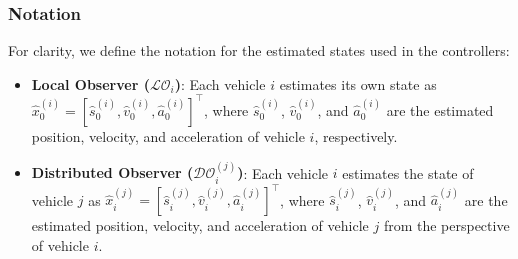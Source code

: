 \documentclass[letterpaper, 10pt, conference]{ieeeconf}  %
\def\LO{\mathcal{LO}} %
\def\DO{\mathcal{DO}} %
\begin{document}
\subsubsection{Notation}
For clarity, we define the notation for the estimated states used in the controllers:
\begin{itemize}
    \item \textbf{Local Observer ($\LO_i$)}: Each vehicle $i$ estimates its own state as $\hat{x}_0^{(i)} = [\hat{s}_0^{(i)}, \hat{v}_0^{(i)}, \hat{a}_0^{(i)}]^\top$, where $\hat{s}_0^{(i)}$, $\hat{v}_0^{(i)}$, and $\hat{a}_0^{(i)}$ are the estimated position, velocity, and acceleration of vehicle $i$, respectively.
    \item \textbf{Distributed Observer ($\DO_i^{(j)}$)}: Each vehicle $i$ estimates the state of vehicle $j$ as $\hat{x}_i^{(j)} = [\hat{s}_i^{(j)}, \hat{v}_i^{(j)}, \hat{a}_i^{(j)}]^\top$, where $\hat{s}_i^{(j)}$, $\hat{v}_i^{(j)}$, and $\hat{a}_i^{(j)}$ are the estimated position, velocity, and acceleration of vehicle $j$ from the perspective of vehicle $i$.
\end{itemize}

\end{document}

